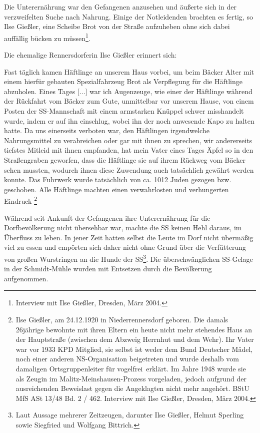\documentclass[a4paper,12pt,ngerman,
]{nisebook}
\begin{document}
Die Unterernährung war den Gefangenen anzusehen und äußerte sich in der verzweifelten Suche nach Nahrung. Einige der Notleidenden brachten es fertig, so Ilse Gießler, eine Scheibe Brot von der Straße aufzuheben ohne sich dabei auffällig bücken zu müssen\footnote{Interview mit Ilse Gießler, Dresden, März 2004.}. 

Die ehemalige Rennersdorferin Ilse Gießler erinnert sich:
\begin{leftbar} 
Fast täglich kamen Häftlinge an unserem Haus vorbei, um beim Bäcker Alter mit einem hierfür gebauten Spezialfahrzeug Brot als Verpflegung für die Häftlinge abzuholen. Eines Tages {[}...{]} war ich Augenzeuge, wie einer der Häftlinge während der Rückfahrt vom Bäcker zum Gute, unmittelbar vor unserem Hause, von einem Posten der SS-Mannschaft mit einem armstarken Knüppel schwer misshandelt wurde, indem er auf ihn einschlug, wobei ihn der noch anwesende Kapo zu halten hatte. Da uns einerseits verboten war, den Häftlingen irgendwelche Nahrungsmittel zu verabreichen oder gar mit ihnen zu sprechen, wir andererseits tiefstes Mitleid mit ihnen empfanden, hat mein Vater eines Tages Äpfel so in den Straßengraben geworfen, dass die Häftlinge sie auf ihrem Rückweg vom Bäcker sehen mussten, wodurch ihnen diese Zuwendung auch tatsächlich gewährt werden konnte. Das Fuhrwerk wurde tatsächlich von ca. 10\textendash{}12 Juden gezogen bzw. geschoben. Alle Häftlinge machten einen verwahrlosten und verhungerten Eindruck
\footnote{Ilse Gießler, am 24.12.1920 in Niederrennersdorf geboren. Die damals 26jährige bewohnte mit ihren Eltern ein heute nicht mehr stehendes Haus an der Hauptstraße (zwischen dem Abzweig Herrnhut und dem Wehr). Ihr Vater war vor 1933 KPD Mitglied, sie selbst ist weder dem Bund Deutscher Mädel, noch einer anderen NS-Organisation beigetreten und wurde deshalb vom damaligen Ortsgruppenleiter für \glqq vogelfrei\grqq~erklärt. Im Jahre 1948 wurde sie als Zeugin im Malitz-Meinshausen-Prozess vorgeladen, jedoch aufgrund der ausreichenden Beweislast gegen die Angeklagten nicht mehr angehört. BStU MfS ASt 13/48 Bd. 2 / 462. Interview mit Ilse Gießler, Dresden, März 2004.} 
\end{leftbar}


Während seit Ankunft der Gefangenen ihre Unterernährung für die Dorfbevölkerung nicht übersehbar war, machte die SS keinen Hehl daraus, im Überfluss zu leben. In jener Zeit hatten selbst die Leute im Dorf nicht übermäßig viel zu essen und empörten sich daher nicht ohne Grund über die Verfütterung von großen Wurstringen an die Hunde der SS\footnote{Laut Aussage mehrerer Zeitzeugen, darunter Ilse Gießler, Helmut Sperling sowie Siegfried und Wolfgang Bittrich.}. Die überschwänglichen SS-Gelage in der Schmidt-Mühle wurden mit Entsetzen durch die Bevölkerung aufgenommen.
\end{document}
